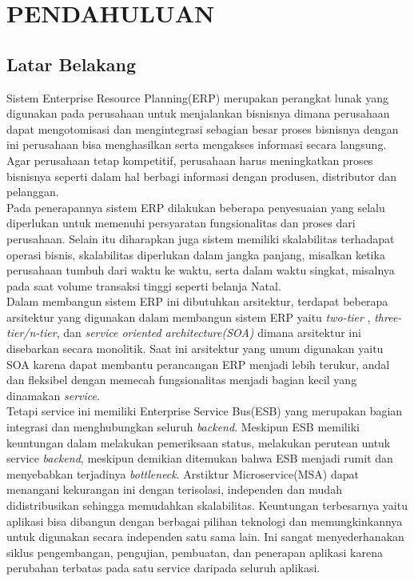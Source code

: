 \chapter{PENDAHULUAN}
\section{Latar Belakang}
Sistem Enterprise Resource Planning(ERP) merupakan perangkat lunak yang digunakan pada perusahaan untuk menjalankan bisnisnya dimana perusahaan dapat mengotomisasi dan mengintegrasi sebagian besar proses bisnisnya dengan ini perusahaan bisa menghasilkan serta mengakses informasi secara langsung. Agar perusahaan tetap kompetitif, perusahaan harus meningkatkan proses bisnisnya seperti dalam hal berbagi informasi dengan produsen, distributor dan pelanggan.\cite{1}\\

Pada penerapannya sistem ERP dilakukan beberapa penyesuaian yang selalu diperlukan untuk memenuhi persyaratan fungsionalitas dan proses dari perusahaan. Selain itu diharapkan juga sistem memiliki skalabilitas terhadapat operasi bisnis, skalabilitas diperlukan dalam jangka panjang, misalkan ketika perusahaan tumbuh dari waktu ke waktu, serta dalam waktu singkat,  misalnya pada saat volume transaksi tinggi seperti belanja Natal.\cite{2}\\

Dalam membangun sistem ERP ini dibutuhkan arsitektur, terdapat beberapa arsitektur yang digunakan dalam membangun sistem ERP yaitu {\it two-tier} , {\it three-tier/n-tier}, dan {\it service oriented architecture(SOA)} dimana arsitektur ini disebarkan secara monolitik. Saat ini arsitektur yang umum digunakan yaitu SOA karena dapat membantu perancangan ERP menjadi lebih terukur, andal dan fleksibel dengan memecah fungsionalitas menjadi bagian kecil yang dinamakan {\it service}.\cite{1}\\

Tetapi service ini memiliki Enterprise Service Bus(ESB) yang merupakan bagian integrasi dan menghubungkan seluruh {\it backend}. Meskipun ESB memiliki keuntungan dalam melakukan pemeriksaan status, melakukan perutean untuk service {\it backend}, meskipun demikian ditemukan bahwa ESB menjadi rumit dan menyebabkan terjadinya {\it bottleneck}. Arstiktur Microservice(MSA) dapat menangani kekurangan ini dengan terisolasi, independen dan mudah didistribusikan sehingga memudahkan skalabilitas. Keuntungan terbesarnya yaitu aplikasi bisa dibangun dengan berbagai pilihan teknologi dan memungkinkannya untuk digunakan secara independen satu sama lain.
Ini sangat menyederhanakan siklus pengembangan, pengujian, pembuatan, dan penerapan aplikasi karena perubahan terbatas pada satu service daripada seluruh aplikasi.\cite{3}\\

